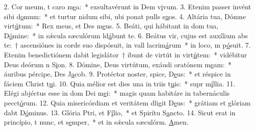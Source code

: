 2. Cor meum, t caro m\uline{e}a:~* exsultavérunt in Dem v\uline{i}vum.
3. Etenim passer invént sibi d\uline{o}mum:~* et turtur nidum sibi, ubi ponat pulls s\uline{u}os.
4. Altária tua, Dómne virt\uline{ú}tum:~* Rex meus, et Des m\uline{e}us.
5. Beáti, qui hábitant in dom tua, D\uline{ó}mine:~* in sǽcula sæculórum ld\uline{á}bunt te.
6. Beátus vir, cujus est auxílium abs te:~† ascensiónes in corde suo dispósuit, in vall lacrim\uline{á}rum~* in loco, m p\uline{ó}suit.
7. Etenim benedictiónem dabit legislátor~† ibunt de virtút in virt\uline{ú}tem:~* vidébitur Deus deórum n S\uline{i}on.
8. Dómine, Deus virtútum, exáudi oratónem m\uline{e}am:~* áuribus pércipe, Des J\uline{a}cob.
9. Protéctor noster, spice, D\uline{e}us:~* et réspice in fáciem Christ t\uline{u}i.
10. Quia mélior est dies una in triis t\uline{u}is:~* supr m\uline{í}llia.
11. Elégi abjéctus esse in dom Dei m\uline{e}i:~* magis quam habitáre in tabernáculis pecct\uline{ó}rum.
12. Quia misericórdiam et veritátem dligit D\uline{e}us:~* grátiam et glóriam dabt D\uline{ó}minus.
13. Glória Ptri, et F\uline{í}lio,~* et Spirítu S\uline{a}ncto.
14. Sicut erat in princípio, t nunc, et s\uline{e}mper,~* et in sǽcula sæculórm. \uline{A}men.
